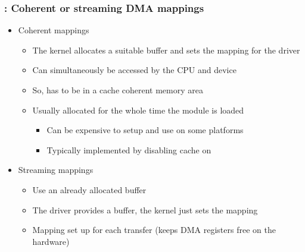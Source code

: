 \begin{frame}
  \frametitle{: Coherent or streaming DMA mappings}
  \begin{itemize}
  \item Coherent mappings
    \begin{itemize}
    \item The kernel allocates a suitable buffer and sets the mapping
      for the driver
    \item Can simultaneously be accessed by the CPU and device
    \item So, has to be in a cache coherent memory area
    \item Usually allocated for the whole time the module is loaded
      \begin{itemize}
      \item Can be expensive to setup and use on some platforms
      \item Typically implemented by disabling cache on 
      \end{itemize}
    \end{itemize}
  \item Streaming mappings
    \begin{itemize}
    \item Use an already allocated buffer
    \item The driver provides a buffer, the kernel just sets the mapping
    \item Mapping set up for each transfer (keeps DMA registers free on
      the hardware)
    \end{itemize}
  \end{itemize}
\end{frame}

